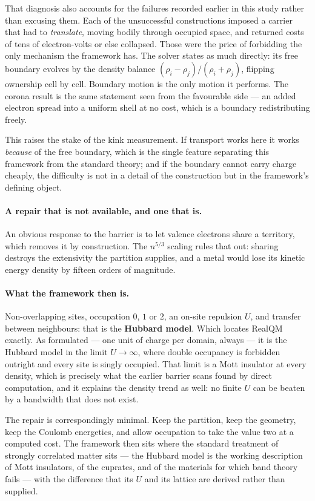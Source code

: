 \documentclass[11pt]{article}
\begin{document}
That diagnosis also accounts for the failures recorded earlier in this study rather than excusing
them. Each of the unsuccessful constructions imposed a carrier that had to \emph{translate}, moving
bodily through occupied space, and returned costs of tens of electron-volts or else collapsed. Those
were the price of forbidding the only mechanism the framework has. The solver states as much
directly: its free boundary evolves by the density balance $(\rho_i - \rho_j)/(\rho_i + \rho_j)$,
flipping ownership cell by cell. Boundary motion is the only motion it performs. The corona result
is the same statement seen from the favourable side --- an added electron spread into a uniform
shell at no cost, which is a boundary redistributing freely.

This raises the stake of the kink measurement. If transport works here it works \emph{because} of
the free boundary, which is the single feature separating this framework from the standard theory;
and if the boundary cannot carry charge cheaply, the difficulty is not in a detail of the
construction but in the framework's defining object.

\paragraph{A repair that is not available, and one that is.} An obvious response to the barrier is
to let valence electrons share a territory, which removes it by construction. The $n^{5/3}$
scaling rules that out: sharing destroys the extensivity the partition supplies, and a metal would
lose its kinetic energy density by fifteen orders of magnitude.

\paragraph{What the framework then is.}\label{sec:hubbard} Non-overlapping sites, occupation $0$, $1$ or $2$, an on-site
repulsion $U$, and transfer between neighbours: that is the \textbf{Hubbard model}. Which locates
RealQM exactly. As formulated --- one unit of charge per domain, always --- it is the Hubbard model in
the limit $U\to\infty$, where double occupancy is forbidden outright and every site is singly
occupied. That limit is a Mott insulator at every density, which is precisely what
the earlier barrier scans found by direct computation, and it explains the density trend as well: no
finite $U$ can be beaten by a bandwidth that does not exist.

The repair is correspondingly minimal. Keep the partition, keep the geometry, keep the Coulomb
energetics, and allow occupation to take the value two at a computed cost. The framework then sits
where the standard treatment of strongly correlated matter sits --- the Hubbard model is the working
description of Mott insulators, of the cuprates, and of the materials for which band theory fails ---
with the difference that its $U$ and its lattice are derived rather than supplied.
\end{document}
